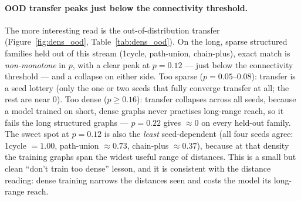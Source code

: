 \documentclass[11pt,a4paper]{article}
\begin{document}
\paragraph{OOD transfer peaks just below the connectivity threshold.} The more interesting
read is the out-of-distribution transfer (Figure~\ref{fig:dens_ood}, Table~\ref{tab:dens_ood}).
On the long, sparse structured families held out of this stream (1cycle, path-union, chain-plus),
exact match is \emph{non-monotone} in $p$, with a clear peak at $p=0.12$ --- just below the
connectivity threshold --- and a collapse on either side. Too sparse ($p=0.05$--$0.08$): transfer
is a seed lottery (only the one or two seeds that fully converge transfer at all; the rest are
near $0$). Too dense ($p\ge0.16$): transfer collapses across all seeds, because a model trained on
short, dense graphs never practises long-range reach, so it fails the long structured graphs ---
$p=0.22$ gives $\approx0$ on every held-out family. The sweet spot at $p=0.12$ is also the
\emph{least} seed-dependent (all four seeds agree: 1cycle $=1.00$, path-union $\approx0.73$,
chain-plus $\approx0.37$), because at that density the training graphs span the widest useful
range of distances. This is a small but clean ``don't train too dense'' lesson, and it is
consistent with the distance reading: dense training narrows the distances seen and costs the
model its long-range reach.
\end{document}
